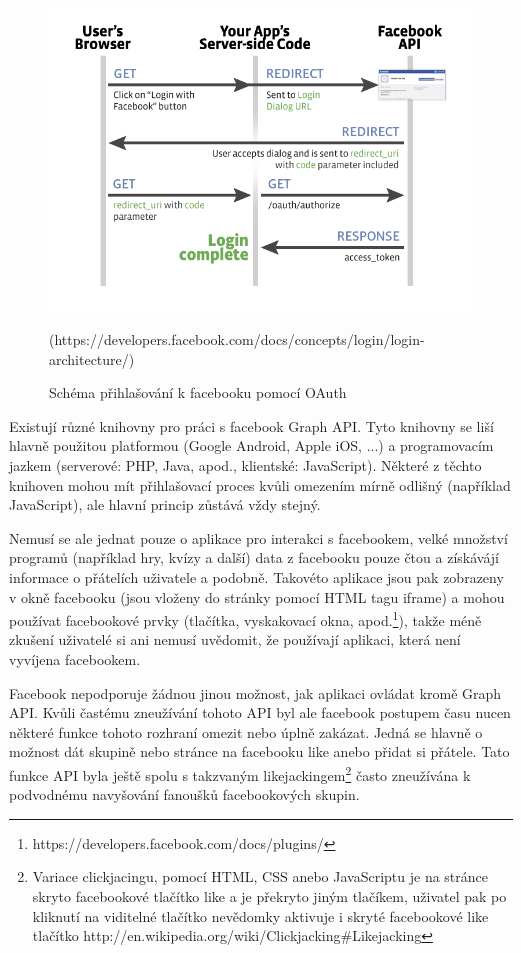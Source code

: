 \documentclass[thesis=M,czech]{FITthesis}[2013/05/10]
\begin{document}
\begin{figure}[h]
\begin{center}
\includegraphics[width=5in]{figures/server-side-diagram.png}
\caption{Schéma přihlašování k facebooku pomocí OAuth}
(https://developers.facebook.com/docs/concepts/login/login-architecture/)
\label{fig:oAuthDiagram}
\end{center}
\end{figure}

Existují různé knihovny pro práci s facebook Graph API. Tyto knihovny se liší hlavně použitou platformou (Google Android, Apple iOS, ...) a programovacím jazkem (serverové: PHP, Java, apod., klientské: JavaScript). Některé z těchto knihoven mohou mít přihlašovací proces kvůli omezením mírně odlišný (například JavaScript), ale hlavní princip zůstává vždy stejný.

Nemusí se ale jednat pouze o aplikace pro interakci s facebookem, velké množství programů (například hry, kvízy a další) data z facebooku pouze čtou a získávájí informace o přátelích uživatele a podobně. Takovéto aplikace jsou pak zobrazeny v okně facebooku (jsou vloženy do stránky pomocí HTML tagu iframe) a mohou používat facebookové prvky (tlačítka, vyskakovací okna, apod.\footnote{https://developers.facebook.com/docs/plugins/}), takže méně zkušení uživatelé si ani nemusí uvědomit, že používají aplikaci, která není vyvíjena facebookem. 

Facebook nepodporuje žádnou jinou možnost, jak aplikaci ovládat kromě Graph API. Kvůli častému zneužívání tohoto API byl ale facebook postupem času nucen některé funkce tohoto rozhraní omezit nebo úplně zakázat. Jedná se hlavně o možnost dát skupině nebo stránce na facebooku like anebo přidat si přátele. Tato funkce API byla ještě spolu s takzvaným likejackingem\footnote{Variace clickjacingu, pomocí HTML, CSS anebo JavaScriptu je na stránce skryto facebookové tlačítko like a je překryto jiným tlačíkem, uživatel pak po kliknutí na viditelné tlačítko nevědomky aktivuje i skryté facebookové like tlačítko http://en.wikipedia.org/wiki/Clickjacking\#Likejacking} často zneužívána k podvodnému navyšování fanoušků facebookových skupin. 
\end{document}
